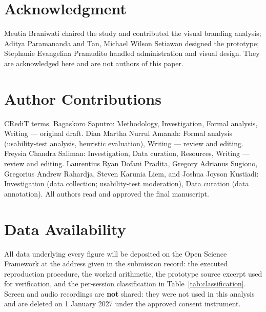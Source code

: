 \documentclass[conference]{IEEEtran}
\begin{document}
\section*{Acknowledgment}

Meutia Braniwati chaired the study and contributed the visual branding analysis; Aditya Paramananda and
Tan, Michael Wilson Setiawan designed the prototype; Stephanie Evangelina Pramudito handled
administration and visual design. They are acknowledged here and are not authors of this paper.

\section*{Author Contributions}

CRediT terms. Bagaskoro Saputro: Methodology, Investigation, Formal analysis, Writing --- original
draft. Dian Martha Nurrul Amanah: Formal analysis (usability-test analysis, heuristic evaluation),
Writing --- review and editing. Freysia Chandra Saliman: Investigation, Data curation, Resources,
Writing --- review and editing. Laurentius Ryan Dofani Pradita, Gregory Adrianus Sugiono, Gregorius
Andrew Rahardja, Steven Karunia Liem, and Joshua Joyson Kustiadi: Investigation (data collection;
usability-test moderation), Data curation (data annotation). All authors read and approved the final
manuscript.

\section*{Data Availability}

All data underlying every figure will be deposited on the Open Science Framework at the address given in
the submission record: the executed reproduction procedure, the worked arithmetic, the prototype source
excerpt used for verification, and the per-session classification in Table~\ref{tab:classification}.
Screen and audio recordings are \textbf{not} shared: they were not used in this analysis and are deleted on
1 January 2027 under the approved consent instrument.
\end{document}
